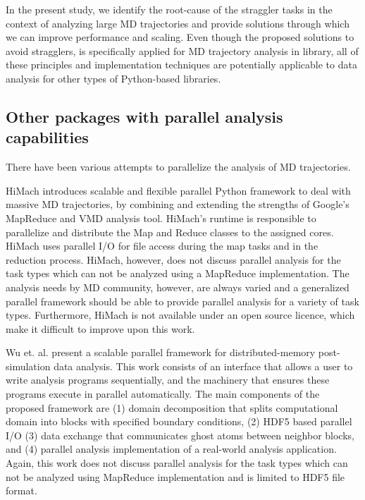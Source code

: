 In the present study, we identify the root-cause of the straggler tasks in the context of analyzing large MD trajectories and provide solutions through which we can improve performance and scaling.
Even though the proposed solutions to avoid stragglers, is specifically applied for MD trajectory analysis in  library, all of these principles and implementation techniques are potentially applicable to data analysis for other types of Python-based libraries.


\subsection{Other packages with parallel analysis capabilities}
\label{sec:otherparallel}

There have been various attempts to parallelize the analysis of MD trajectories. 

HiMach \cite{himach-2008} introduces scalable and flexible parallel Python framework to deal with massive MD trajectories, by combining and extending the strengths of Google's MapReduce and VMD analysis tool. 
HiMach's runtime is responsible to parallelize and distribute the Map and Reduce classes to the assigned cores.
HiMach uses parallel I/O for file access during the map tasks and  in the reduction process. 
HiMach, however, does not discuss parallel analysis for the task types which can not be analyzed using a MapReduce implementation.
The analysis needs by MD community, however, are always varied and a generalized parallel framework should be able to provide parallel analysis for a variety of task types.
Furthermore, HiMach is not available under an open source licence, which make it difficult to improve upon this work.

Wu et. al. \cite{Wu_et.al} present a scalable parallel framework for distributed-memory post-simulation data analysis.
This work consists of an interface that allows a user to write analysis programs sequentially, and the machinery that ensures these programs execute in parallel automatically. 
The main components of the proposed framework are (1) domain decomposition that splits computational domain into blocks with specified boundary conditions, (2) HDF5 based parallel I/O (3) data exchange that communicates ghost atoms between neighbor blocks, and (4) parallel analysis implementation of a real-world analysis application.
Again, this work does not discuss parallel analysis for the task types which can not be analyzed using MapReduce implementation and is limited to HDF5 file format.

